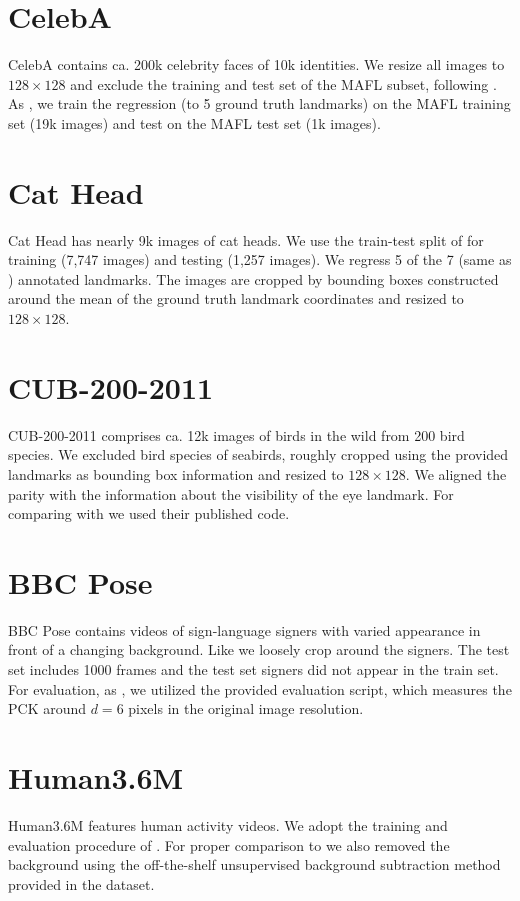 \section*{CelebA}{CelebA} \cite{liu15facewild} contains ca. 200k celebrity faces of 10k identities.
We resize all images to $128\times 128$ and exclude the training and test set of the MAFL subset, following \cite{thewlis17}.
As  \cite{thewlis17, zhang18}, we train the regression (to 5 ground truth landmarks) on the MAFL training set (19k images) and test on the MAFL test set (1k images).

\section*{Cat Head}{Cat Head} \cite{zhang08cathead}  has nearly 9k images of cat heads.
We use the train-test split of \cite{zhang18} for training (7,747 images) and testing (1,257 images).
We regress 5 of the 7 (same as \cite{zhang18}) annotated landmarks.
The images are cropped by bounding boxes constructed around the mean of the ground truth landmark coordinates and resized to $128\times128$.


\section*{CUB-200-2011}{CUB-200-2011} \cite{wah11birds} comprises ca. 12k images of birds in the wild from 200 bird species.
We excluded bird species of seabirds, roughly cropped using the provided landmarks as bounding box information and resized to $128\times128$.
We aligned the parity with the information about the visibility of the eye landmark.
For comparing with \cite{zhang18} we used their published code.


\section*{BBC Pose}{BBC Pose} \cite{charles13bbcpose} contains videos of sign-language signers with varied appearance in front of a changing background. Like \cite{jakab18} we loosely crop around the signers.
The test set includes 1000 frames and the test set signers did not appear in the train set.
For evaluation, as \cite{jakab18}, we utilized the provided evaluation script, which measures the PCK around $d=6$ pixels in the original image resolution.


\section*{Human3.6M}{Human3.6M} \cite{ionescu14human36m} features human activity videos.
We adopt the training and evaluation procedure of \cite{zhang18}.
For proper comparison to \cite{zhang18} we also removed the background using the off-the-shelf unsupervised background subtraction method provided in the dataset.


